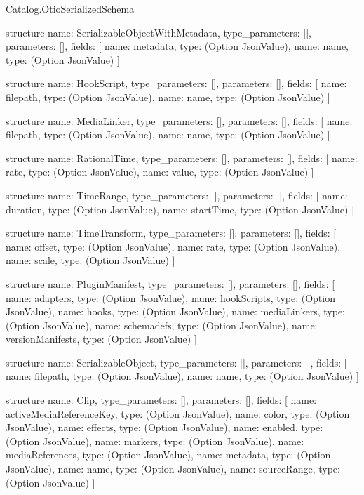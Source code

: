 \begin{lexlean}{Catalog.OtioSerializedSchema}
\begin{semanticmodule}
structure{
  name: SerializableObjectWithMetadata,
  type_parameters: [],
  parameters: [],
  fields: [
    {name: metadata, type: (Option JsonValue)},
    {name: name, type: (Option JsonValue)}
  ]
}

structure{
  name: HookScript,
  type_parameters: [],
  parameters: [],
  fields: [
    {name: filepath, type: (Option JsonValue)},
    {name: name, type: (Option JsonValue)}
  ]
}

structure{
  name: MediaLinker,
  type_parameters: [],
  parameters: [],
  fields: [
    {name: filepath, type: (Option JsonValue)},
    {name: name, type: (Option JsonValue)}
  ]
}

structure{
  name: RationalTime,
  type_parameters: [],
  parameters: [],
  fields: [
    {name: rate, type: (Option JsonValue)},
    {name: value, type: (Option JsonValue)}
  ]
}

structure{
  name: TimeRange,
  type_parameters: [],
  parameters: [],
  fields: [
    {name: duration, type: (Option JsonValue)},
    {name: startTime, type: (Option JsonValue)}
  ]
}

structure{
  name: TimeTransform,
  type_parameters: [],
  parameters: [],
  fields: [
    {name: offset, type: (Option JsonValue)},
    {name: rate, type: (Option JsonValue)},
    {name: scale, type: (Option JsonValue)}
  ]
}

structure{
  name: PluginManifest,
  type_parameters: [],
  parameters: [],
  fields: [
    {name: adapters, type: (Option JsonValue)},
    {name: hookScripts, type: (Option JsonValue)},
    {name: hooks, type: (Option JsonValue)},
    {name: mediaLinkers, type: (Option JsonValue)},
    {name: schemadefs, type: (Option JsonValue)},
    {name: versionManifests, type: (Option JsonValue)}
  ]
}

structure{
  name: SerializableObject,
  type_parameters: [],
  parameters: [],
  fields: [
    {name: filepath, type: (Option JsonValue)},
    {name: name, type: (Option JsonValue)}
  ]
}

structure{
  name: Clip,
  type_parameters: [],
  parameters: [],
  fields: [
    {name: activeMediaReferenceKey, type: (Option JsonValue)},
    {name: color, type: (Option JsonValue)},
    {name: effects, type: (Option JsonValue)},
    {name: enabled, type: (Option JsonValue)},
    {name: markers, type: (Option JsonValue)},
    {name: mediaReferences, type: (Option JsonValue)},
    {name: metadata, type: (Option JsonValue)},
    {name: name, type: (Option JsonValue)},
    {name: sourceRange, type: (Option JsonValue)}
  ]
}


\end{semanticmodule}
\end{lexlean}
